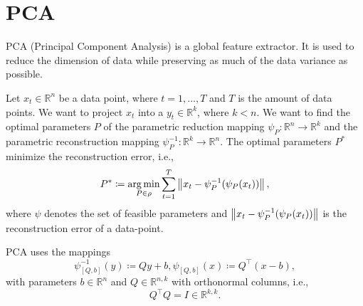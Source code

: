 \section{PCA}
PCA (Principal Component Analysis) is a global feature extractor. It is used to reduce the dimension of data while preserving as much of the data variance as possible.

Let $x_t \in \mathbb{R}^n$ be a data point, where $t=1,\dots,T$ and $T$ is the amount of data points. We want to project $x_t$ into a $y_t \in \mathbb{R}^k$, where $k < n$. We want to find the optimal parameters $P$ of the parametric reduction mapping $\psi_P: \mathbb{R}^n \rightarrow \mathbb{R}^k$ and the parametric reconstruction mapping $\psi_P^{-1}: \mathbb{R}^k \rightarrow \mathbb{R}^n$. The optimal parameters $P^{*}$ minimize the reconstruction error, i.e.,
\begin{equation}
    P^{*} \coloneqq \operatorname*{arg\,min}_{P \in \rho} \sum_{t=1}^T \left\lVert x_t - \psi_P^{-1}(\psi_P(x_t))\right\rVert,
    \label{eq:mapping_optimization}
\end{equation}
where $\psi$ denotes the set of feasible parameters and $\left\lVert x_t - \psi_P^{-1}(\psi_P(x_t))\right\rVert$ is the reconstruction error of a data-point.

PCA uses the mappings
\begin{equation}
    \psi_{[Q,b]}^{-1}(y) \coloneqq Qy+b, \psi_{[Q,b]}(x) \coloneqq Q^{\top}(x-b),
    \label{eq:pca_mappings}
\end{equation}
with parameters $b \in \mathbb{R}^n$ and $Q \in \mathbb{R}^{n,k}$ with orthonormal columns, i.e.,
\begin{equation}
    Q^{\top}Q = I \in \mathbb{R}^{k,k}.
    \label{eq:pca_identity}
\end{equation}


